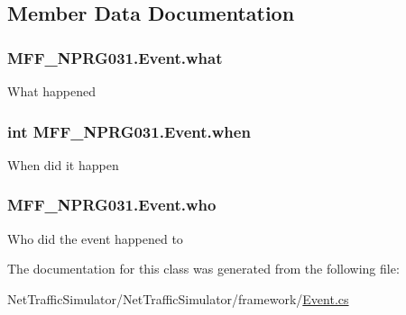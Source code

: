 \subsection{Member Data Documentation}
\hypertarget{classMFF__NPRG031_1_1Event_a67299cb9ed36b10f47f75d41a270b4b7}{
\subsubsection[{what}]{ M\-F\-F\-\_\-\-N\-P\-R\-G031.\-Event.\-what}}\label{classMFF__NPRG031_1_1Event_a67299cb9ed36b10f47f75d41a270b4b7}
What happened \hypertarget{classMFF__NPRG031_1_1Event_a7a80c569961ddf9f12ef8f7cb5782794}{
\subsubsection[{when}]{\setlength{\rightskip}{0pt plus 5cm}int M\-F\-F\-\_\-\-N\-P\-R\-G031.\-Event.\-when}}\label{classMFF__NPRG031_1_1Event_a7a80c569961ddf9f12ef8f7cb5782794}
When did it happen \hypertarget{classMFF__NPRG031_1_1Event_a6e7bdfc2ff5a26bd896029b56d8f0756}{
\subsubsection[{who}]{ M\-F\-F\-\_\-\-N\-P\-R\-G031.\-Event.\-who}}\label{classMFF__NPRG031_1_1Event_a6e7bdfc2ff5a26bd896029b56d8f0756}
Who did the event happened to 

The documentation for this class was generated from the following file\-:\begin{DoxyCompactItemize}
\item 
Net\-Traffic\-Simulator/\-Net\-Traffic\-Simulator/framework/\hyperlink{Event_8cs}{Event.\-cs}\end{DoxyCompactItemize}
